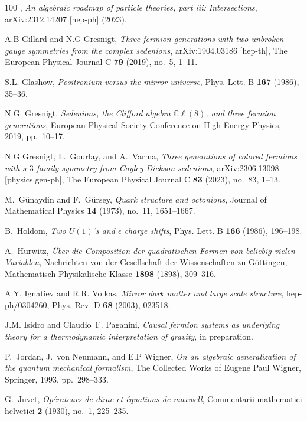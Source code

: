 \documentclass[reqno,11pt]{amsart}
\numberwithin{equation}{section}
\newcommand{\1}{\mbox{\rm 1 \hspace{-1.05 em} 1}}
\begin{document}
{\begin{thebibliography}{100}
\bysame, \emph{An algebraic roadmap of particle theories, part iii:
  {I}ntersections}, arXiv:2312.14207 [hep-ph] (2023).

A.B Gillard and N.G Gresnigt, \emph{Three fermion generations with two unbroken
  gauge symmetries from the complex sedenions}, arXiv:1904.03186 [hep-th], The
  European Physical Journal C \textbf{79} (2019), no.~5, 1--11.

S.L. Glashow, \emph{Positronium versus the mirror universe}, Phys. Lett. B
  \textbf{167} (1986), 35--36.

N.G. Gresnigt, \emph{Sedenions, the {C}lifford algebra $\mathbb{C}\ell (8)$,
  and three fermion generations}, European Physical Society Conference on High
  Energy Physics, 2019, pp.~10--17.

N.G Gresnigt, L.~Gourlay, and A.~Varma, \emph{Three generations of colored
  fermions with $s\_3$ family symmetry from {C}ayley-{D}ickson sedenions},
  arXiv:2306.13098 [physics.gen-ph], The European Physical Journal C
  \textbf{83} (2023), no.~83, 1--13.

M.~G{\"u}naydin and F.~G{\"u}rsey, \emph{Quark structure and octonions},
  Journal of Mathematical Physics \textbf{14} (1973), no.~11, 1651--1667.

B.~Holdom, \emph{Two {$U(1)$}'s and $\epsilon$ charge shifts}, Phys. Lett. B
  \textbf{166} (1986), 196--198.

A.~Hurwitz, \emph{{\"Uber die Composition der quadratischen Formen von beliebig
  vielen Variablen}}, Nachrichten von der Gesellschaft der Wissenschaften zu
  G{\"o}ttingen, Mathematisch-Physikalische Klasse \textbf{1898} (1898),
  309--316.

A.Y. Ignatiev and R.R. Volkas, \emph{Mirror dark matter and large scale
  structure}, hep-ph/0304260, Phys. Rev. D \textbf{68} (2003), 023518.

J.M. Isidro and Claudio~F. Paganini, \emph{Causal fermion systems as underlying
  theory for a thermodynamic interpretation of gravity}, in preparation.

P.~Jordan, J.~von Neumann, and E.P Wigner, \emph{On an algebraic generalization
  of the quantum mechanical formalism}, {The Collected Works of Eugene Paul
  Wigner}, Springer, 1993, pp.~298--333.

G.~Juvet, \emph{Op{\'e}rateurs de dirac et {\'e}quations de maxwell},
  Commentarii mathematici helvetici \textbf{2} (1930), no.~1, 225--235.


\end{thebibliography}}
\end{document}
